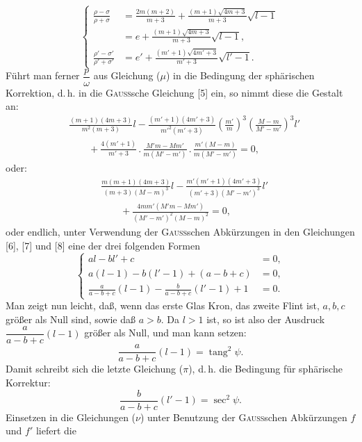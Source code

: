 \begin{equation*}\tag*{($\nu$)}
\left\{\begin{aligned}
\frac{\rho-\sigma}{\rho+\sigma}&=\frac{2m(m+2)}{m+3}+\frac{(m+1)\sqrt{4m+3}}{m+3}\sqrt{l-1}\\
&=e+\frac{(m+1)\sqrt{4m+3}}{m+3}\sqrt{l-1},\\[4pt]
\frac{\rho'-\sigma'}{\rho'+\sigma'}&=e'+\frac{(m'+1)\sqrt{4m'+3}}{m'+3}\sqrt{l'-1}.
\end{aligned}\right.
\end{equation*}
\noindent Führt man ferner $\dfrac p\omega$ aus Gleichung ($\mu$) in die Bedingung der sphärischen Korrektion, d.\,h. in die \textsc{Gauss}sche Gleichung [5] ein, so nimmt diese die Gestalt an:
\[\begin{aligned}
&\frac{(m+1)(4m+3)}{m^2(m+3)}l
-\frac{(m'+1)(4m'+3)}{m'^2(m'+3)}\left(\frac{m'}m\right)^3\left(\frac{M-m}{M'-m'}\right)^3l'\\
&\qquad+\frac{4(m'+1)}{m'+3}\mathbin{.}\frac{M'm-Mm'}{m(M'-m')}\mathbin{.}\frac{m'(M-m)}{m(M'-m')}=0,
\end{aligned}\]
\noindent oder:
\begin{equation*}\tag*{($\xi$)}
\begin{aligned}
&\frac{m(m+1)(4m+3)}{(m+3)(M-m)^3}l
-\frac{m'(m'+1)(4m'+3)}{(m'+3)(M'-m')^3}l'\\
&\qquad+\frac{4mm'(M'm-Mm')}{(M'-m')^2(M-m)^2}=0,
\end{aligned}
\end{equation*}
\noindent oder endlich, unter Verwendung der \textsc{Gauss}schen Abkürzungen in den Gleichungen [6], [7] und [8] eine der drei folgenden Formen
\begin{equation*}\tag*{($\pi$)}
\left\{\begin{aligned}
al-bl'+c&=0,\\[3pt]
a(l-1)-b(l'-1)+(a-b+c)&=0,\\[3pt]
\frac a{a-b+c}(l-1)-\frac b{a-b+c}(l'-1)+1&=0.
\end{aligned}\right.
\end{equation*}
\noindent Man zeigt nun leicht, daß, wenn das erste Glas Kron, das zweite Flint ist, $a,b,c$ größer als Null sind, sowie daß $a>b$. Da $l>1$ ist, so ist also der Ausdruck $\dfrac a{a-b+c}(l-1)$ größer als Null, und man kann setzen:
\[\frac a{a-b+c}(l-1)=\operatorname{tang}^2\psi.\]
\noindent Damit schreibt sich die letzte Gleichung ($\pi$), d.\,h. die Bedingung für sphärische Korrektur:
\[\frac b{a-b+c}(l'-1)=\sec^2\psi.\]
\noindent Einsetzen in die Gleichungen ($\nu$) unter Benutzung der \textsc{Gauss}schen Abkürzungen $f$ und $f'$ liefert die
